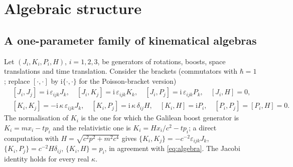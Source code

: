 \documentclass[11pt,a4paper]{article}
\newcommand{\ii}{\mathrm{i}}
\newcommand{\eps}{\varepsilon}
\theoremstyle{plain}
\theoremstyle{definition}
\theoremstyle{remark}
\begin{document}
\section{Algebraic structure}\label{sec:algebra}

\subsection{A one-parameter family of kinematical algebras}
Let $(J_i,K_i,P_i,H)$, $i=1,2,3$, be generators of rotations, boosts, space translations and time
translation. Consider the brackets (commutators with $\hbar=1$; replace $[\cdot,\cdot]$ by
$\ii\{\cdot,\cdot\}$ for the Poisson-bracket version)
\begin{equation}\label{eq:algebra}
\begin{aligned}
&[J_i,J_j]=\ii\,\eps_{ijk}J_k,\quad [J_i,K_j]=\ii\,\eps_{ijk}K_k,\quad [J_i,P_j]=\ii\,\eps_{ijk}P_k,
\quad [J_i,H]=0,\\
&[K_i,K_j]=-\ii\,\kappa\,\eps_{ijk}J_k,\quad [K_i,P_j]=\ii\,\kappa\,\delta_{ij}H,\quad
[K_i,H]=\ii P_i,\quad [P_i,P_j]=[P_i,H]=0 .
\end{aligned}
\end{equation}
The normalisation of $K_i$ is the one for which the Galilean boost generator is
$K_i=m x_i-tp_i$ and the relativistic one is $K_i=Hx_i/c^2-tp_i$; a direct computation with
$H=\sqrt{c^2p^2+m^2c^4}$ gives $\{K_i,K_j\}=-c^{-2}\eps_{ijk}J_k$, $\{K_i,P_j\}=c^{-2}H\delta_{ij}$,
$\{K_i,H\}=p_i$, in agreement with \eqref{eq:algebra}. The Jacobi identity holds for every real
$\kappa$.
\end{document}
